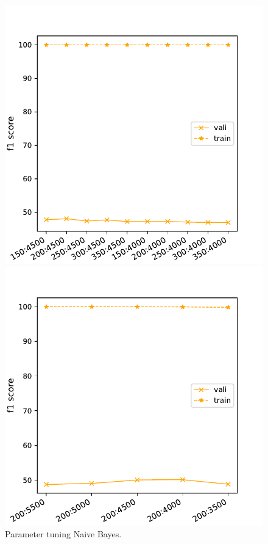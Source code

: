 \documentclass[11pt]{article}
\begin{document}
\begin{figure}[h]
\begin{minipage}[t]{0.33\textwidth}
\end{minipage}
\begin{minipage}[t]{0.33\textwidth}
\includegraphics[width=1\linewidth]{amazon/NB_Xrange3.pdf}
\end{minipage}
\begin{minipage}[t]{0.33\textwidth}
\includegraphics[width=1\linewidth]{amazon/NB_Xrange4.pdf}
\end{minipage}
\caption{Parameter tuning Naive Bayes.}
\label{Fig::Naive Bayes parameter tuning}
\end{figure}
\end{document}
